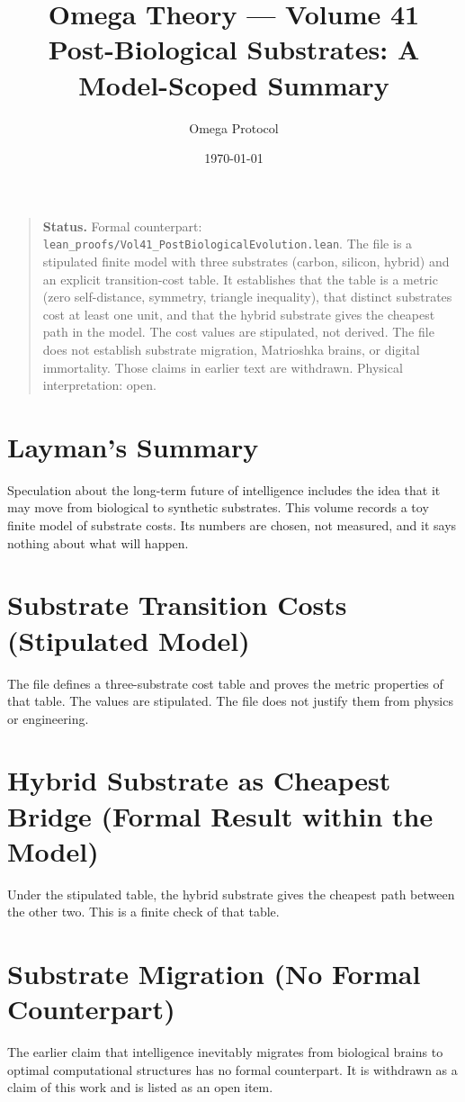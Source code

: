 \documentclass[11pt, a4paper]{article}
\title{Omega Theory --- Volume 41\\\Large Post-Biological Substrates: A Model-Scoped Summary}
\author{Omega Protocol}
\date{\today}
\begin{document}
\maketitle

\begin{quote}
\textbf{Status.} Formal counterpart: \texttt{lean\_proofs/Vol41\_PostBiologicalEvolution.lean}. The file is a stipulated finite model with three substrates (carbon, silicon, hybrid) and an explicit transition-cost table. It establishes that the table is a metric (zero self-distance, symmetry, triangle inequality), that distinct substrates cost at least one unit, and that the hybrid substrate gives the cheapest path in the model. The cost values are stipulated, not derived. The file does not establish substrate migration, Matrioshka brains, or digital immortality. Those claims in earlier text are withdrawn. Physical interpretation: open.
\end{quote}

\section*{Layman's Summary}
Speculation about the long-term future of intelligence includes the idea that it may move from biological to synthetic substrates. This volume records a toy finite model of substrate costs. Its numbers are chosen, not measured, and it says nothing about what will happen.

\section{Substrate Transition Costs (Stipulated Model)}
The file defines a three-substrate cost table and proves the metric properties of that table. The values are stipulated. The file does not justify them from physics or engineering.

\section{Hybrid Substrate as Cheapest Bridge (Formal Result within the Model)}
Under the stipulated table, the hybrid substrate gives the cheapest path between the other two. This is a finite check of that table.

\section{Substrate Migration (No Formal Counterpart)}
The earlier claim that intelligence inevitably migrates from biological brains to optimal computational structures has no formal counterpart. It is withdrawn as a claim of this work and is listed as an open item.
\end{document}
